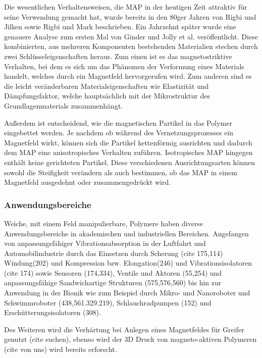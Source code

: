 Die wesentlichen Verhaltensweisen, die MAP in der heutigen Zeit attraktiv für seine Verwendung gemacht hat, wurde bereits in den 80ger Jahren von Rigbi und Jilken \cite{Rigbi1} sowie Rigbi und Mark \cite{Rigbi2} beschrieben. Ein Jahrzehnt später wurde eine genauere Analyse zum ersten Mal von Ginder und Jolly et al. \cite{ginder} veröffentlicht. 
Diese kombinierten, aus mehreren Komponenten bestehenden Materialien stechen durch zwei Schlüsseleigenschaften heraus. 
Zum einen ist es das magnetostriktive Verhalten, bei dem es sich um das Phänomen der Verformung eines Materials handelt, welches durch ein Magnetfeld hervorgerufen wird. \cite{gulley}
Zum anderen sind es die leicht veränderbaren Materialeigenschaften wie Elastizität und Dämpfungsfaktor, welche hauptsächlich mit der Mikrostruktur des Grundlagenmaterials zusammenhängt. \cite{Varga1} \cite{Varga2}

Außerdem ist entscheidend, wie die magnetischen Partikel in das Polymer eingebettet werden. Je nachdem ob während des Vernetzungsprozesses ein Magnetfeld wirkt, können sich die Partikel kettenförmig ausrichten und dadurch dem MAP eine anisotropisches Verhalten zuführen. Isotropisches MAP hingegen enthält keine gerichteten Partikel. Diese verschiedenen Ausrichtungsarten können sowohl die Steifigkeit verändern als auch bestimmen, ob das MAP in einem Magnetfeld ausgedehnt oder zusammengedrückt wird. 


\subsubsection*{Anwendungsbereiche}
Weiche, mit einem Feld manipulierbare, Polymere haben diverse Anwendungsbereiche in akademischen und industriellen Bereichen. Angefangen von anpassungsfähiger Vibrationsabsorption in der Luftfahrt und Automobilindustrie durch das Einsetzen durch Scherung (cite 175,114) Windung(202) und Kompression bzw. Elongation(246) und Vibrationsisolatoren (cite 174) sowie Sensoren (174,334), Ventile und Aktoren (55,254) und anpassungsfähige Sandwichartige Strukturen (575,576,560) bis hin zur Anwendung in der Bionik wie zum Beispiel durch Mikro- und Nanoroboter und Schwimmroboter (438,561.329.219), Schlauchradpumpen (152) und Erschütterungsisolatoren (308).

Des Weiteren wird die Verhärtung bei Anlegen eines Magnetfeldes für Greifer genutzt (cite suchen), ebenso wird der 3D Druck von magneto-aktiven Polymeren (cite von uns) wird bereits erforscht.

	
